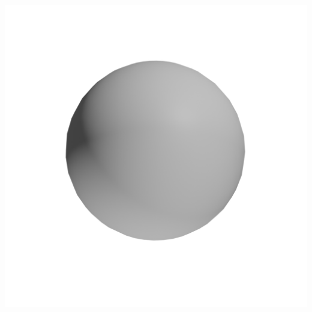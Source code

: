 \documentclass[11pt,class=report,crop=false]{standalone}
\begin{document}
\begin{center}
\includegraphics[scale=\myscale,scale=0.15,trim={3cm 7cm 3cm 7cm},clip]{figures/texture-sphere-smooth}
\end{center}
\end{document}
